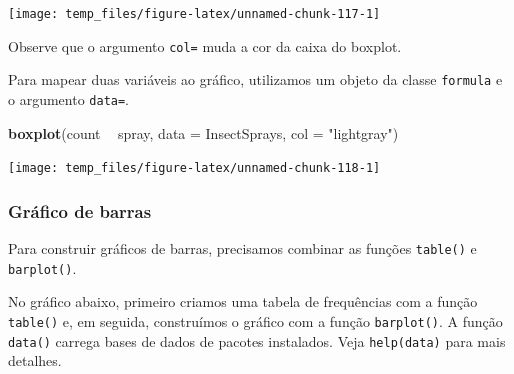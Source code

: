\documentclass[]{book}
\newenvironment{Shaded}{\begin{snugshade}}{\end{snugshade}}
\newcommand{\CommentTok}[1]{\textcolor[rgb]{0.56,0.35,0.01}{\textit{#1}}}
\newcommand{\DataTypeTok}[1]{\textcolor[rgb]{0.13,0.29,0.53}{#1}}
\newcommand{\KeywordTok}[1]{\textcolor[rgb]{0.13,0.29,0.53}{\textbf{#1}}}
\newcommand{\NormalTok}[1]{#1}
\newcommand{\OperatorTok}[1]{\textcolor[rgb]{0.81,0.36,0.00}{\textbf{#1}}}
\newcommand{\StringTok}[1]{\textcolor[rgb]{0.31,0.60,0.02}{#1}}
\begin{document}
\begin{Shaded}
\end{Shaded}

\begin{center}\texttt{[image: temp\_files/figure-latex/unnamed-chunk-117-1]} \end{center}

Observe que o argumento \texttt{col=} muda a cor da caixa do boxplot.

Para mapear duas variáveis ao gráfico, utilizamos um objeto da classe \texttt{formula} e o argumento \texttt{data=}.

\begin{Shaded}
\begin{Highlighting}[]
\KeywordTok{boxplot}\NormalTok{(count }\OperatorTok{~}\StringTok{ }\NormalTok{spray, }\DataTypeTok{data =}\NormalTok{ InsectSprays, }\DataTypeTok{col =} \StringTok{"lightgray"}\NormalTok{)}
\end{Highlighting}
\end{Shaded}

\begin{center}\texttt{[image: temp\_files/figure-latex/unnamed-chunk-118-1]} \end{center}

\hypertarget{gruxe1fico-de-barras}{%
\subsubsection{Gráfico de barras}\label{gruxe1fico-de-barras}}

Para construir gráficos de barras, precisamos combinar as funções \texttt{table()} e \texttt{barplot()}.

No gráfico abaixo, primeiro criamos uma tabela de frequências com a função \texttt{table()} e, em seguida, construímos o gráfico com a função \texttt{barplot()}. A função \texttt{data()} carrega bases de dados de pacotes instalados. Veja \texttt{help(data)} para mais detalhes.

\begin{Shaded}
\end{Shaded}
\end{document}
